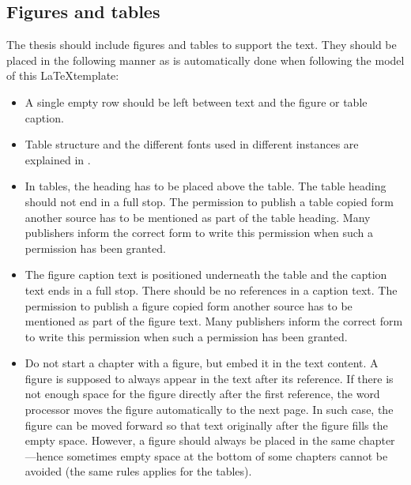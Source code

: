 \subsection{Figures and tables}
The thesis should include figures and tables to support the text. They should be placed in the following manner as is automatically done when following the model of this \LaTeX template:

\begin{itemize}
    \setlength\itemsep{0pt}
    \setlength\parskip{0pt}
    \item A single empty row should be left between text and the figure or table caption. 
    \item Table structure and the different fonts used in different instances are explained in
    .
    \item In tables, the heading has to be placed above the table. The table heading should
    not end in a full stop. The permission to publish a table copied form another
    source has to be mentioned as part of the table heading. Many publishers inform
    the correct form to write this permission when such a permission has been
    granted.
    \item The figure caption text is positioned underneath the table and the caption text ends
    in a full stop. There should be no references in a caption text. The permission to
    publish a figure copied form another source has to be mentioned as part of the
    figure text. Many publishers inform the correct form to write this permission
    when such a permission has been granted.
    \item Do not start a chapter with a figure, but embed it in the text content. A figure is
    supposed to always appear in the text after its reference. If there is not enough
    space for the figure directly after the first reference, the word processor moves the
    figure automatically to the next page. In such case, the figure can be moved 
    forward so that text originally after the figure fills the empty space. However, a
    figure should always be placed in the same chapter---hence sometimes empty
    space at the bottom of some chapters cannot be avoided (the same rules applies for the
    tables).
\end{itemize}

